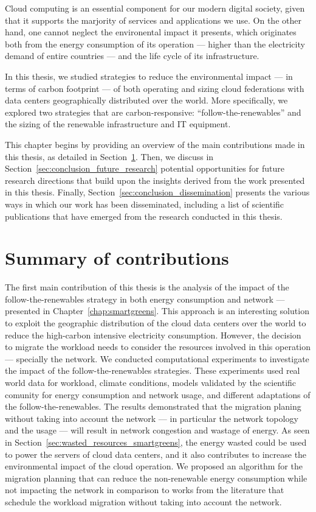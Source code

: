 Cloud computing is an essential component for our modern digital society, given that it supports the marjority of services and applications we use. On the other hand, one cannot neglect the environental impact it presents, which originates both from the energy consumption of its operation --- higher than the electricity demand of entire countries --- and the life cycle of its infrastructure.

In this thesis, we studied strategies to reduce the environmental impact --- in terms of carbon footprint --- of both operating and sizing cloud federations with data centers geographically distributed over the world. More specifically, we explored two strategies that are carbon-responsive: ``follow-the-renewables'' and the sizing of the renewable infrastructure and IT equipment.

This chapter begins by providing an overview of the main contributions made in this thesis, as detailed in Section~\ref{sec:conclusion_summary}. Then, we discuss in Section~\ref{sec:conclusion_future_research} potential opportunities for future research directions that build upon the insights derived from the work presented in this thesis. Finally, Section~\ref{sec:conclusion_dissemination} presents the various ways in which our work has been disseminated, including a list of scientific publications that have emerged from the research conducted in this thesis.


\section{Summary of contributions }

\label{sec:conclusion_summary}

The first main contribution of this thesis is the analysis of the impact of the follow-the-renewables strategy in both energy consumption and network --- presented in Chapter~\ref{chap:smartgreens}. This approach is an interesting solution to exploit the geographic distribution of the cloud data centers over the world to reduce the high-carbon intensive electricity consumption. However, the decision to migrate the workload needs to consider the resources involved in this operation --- specially the network. We conducted computational experiments to investigate the impact of the follow-the-renewables strategies. These experiments used real world data for workload, climate conditions, models validated by the scientific comunity for energy consumption and network usage, and different adaptations of the follow-the-renewables.  The results demonstrated that the migration planing without taking into account the network --- in particular the network topology and the usage --- will result in network congestion and wastage of energy. As seen in Section~\ref{sec:wasted_resources_smartgreens}, the energy wasted could be used to power the servers of cloud data centers, and it also contributes to increase the environmental impact of the cloud operation. We proposed an algorithm for the migration planning that can reduce the non-renewable energy consumption while not impacting the network in comparison to works from the literature that schedule the workload migration without taking into account the network.


